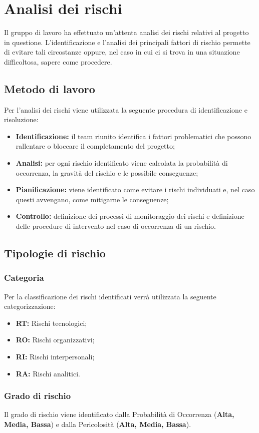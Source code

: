 \section{Analisi dei rischi}
Il gruppo di lavoro ha effettuato un'attenta analisi dei rischi relativi al progetto in questione. L'identificazione e l'analisi dei principali fattori di rischio permette di evitare tali circostanze oppure, nel caso in cui ci si trova in una situazione difficoltosa, sapere come procedere.
\subsection{Metodo di lavoro}
Per l'analisi dei rischi viene utilizzata la seguente procedura di identificazione e risoluzione:
\begin{itemize}
	\item \textbf{Identificazione:} il team riunito identifica i fattori problematici che possono rallentare o bloccare il completamento del progetto;
	\item \textbf{Analisi:} per ogni rischio identificato viene calcolata la probabilità di occorrenza, la gravità del rischio e le possibile conseguenze;
	\item \textbf{Pianificazione:} viene identificato come evitare i rischi individuati e, nel caso questi avvengano, come mitigarne le conseguenze;
	\item \textbf{Controllo:} definizione dei processi di monitoraggio dei rischi e definizione delle procedure di intervento nel caso di occorrenza di un rischio.
\end{itemize}
\subsection{Tipologie di rischio}
\subsubsection{Categoria}
Per la classificazione dei rischi identificati verrà utilizzata la seguente categorizzazione:
\begin{itemize}
	\item \textbf{RT:} Rischi tecnologici;
	\item \textbf{RO:} Rischi organizzativi;
	\item \textbf{RI:} Rischi interpersonali;
	\item \textbf{RA:} Rischi analitici.
\end{itemize}
\subsubsection{Grado di rischio}
Il grado di rischio viene identificato dalla Probabilità di Occorrenza (\textbf{Alta, Media, Bassa}) e dalla Pericolosità (\textbf{Alta, Media, Bassa}).
